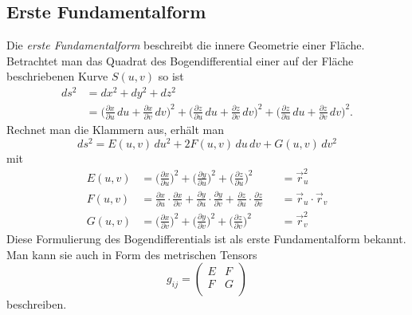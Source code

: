\subsection{Erste Fundamentalform
\label{mongeampere:subsection:finibus}}
Die \emph{erste Fundamentalform} beschreibt die innere Geometrie einer Fläche.
%
%
Betrachtet man das Quadrat des Bogendifferential einer auf der Fläche 
%
beschriebenen Kurve $S(u,v)$ so ist 
\begin{equation*}
  \begin{split}
    d s^2 &= d x^2 + d y^2 + d z^2 \\
          &= \biggl(\frac{\partial x}{\partial u}\,d u + \frac{\partial x}{\partial v}\,d v  \biggr)^2
          + \biggl(\frac{\partial z}{\partial u}\,d u + \frac{\partial z}{\partial v}\,d v  \biggr)^2
          + \biggl(\frac{\partial z}{\partial u}\,d u + \frac{\partial z}{\partial v}\,d v  \biggr)^2.
  \end{split}
\end{equation*}
Rechnet man die Klammern aus, erhält man 
\begin{equation*}
    d s^2 = E(u,v) \,d u^2 + 2F(u,v) \,d u \,d v + G(u,v)\,d v^2
\end{equation*}
mit
\begin{equation*}
\begin{aligned}
     E(u,v) &= \biggl(\frac{\partial x}{\partial u} \biggr)^2 +
     \biggl(\frac{\partial y}{\partial u} \biggr)^2 +
     \biggl(\frac{\partial z}{\partial u} \biggr)^2 
            &&= \vec r_u^2\\
     F(u,v) &= 
     \frac{\partial x}{\partial u} \cdot \frac{\partial x}{\partial v} +
     \frac{\partial y}{\partial u} \cdot \frac{\partial y}{\partial v} +
     \frac{\partial z}{\partial u} \cdot \frac{\partial z}{\partial v}
            &&= \vec r_u \cdot \vec r_v \\
      G(u,v) &= \biggl(\frac{\partial x}{\partial v} \biggr)^2 +
     \biggl(\frac{\partial y}{\partial v} \biggr)^2 +
     \biggl(\frac{\partial z}{\partial v} \biggr)^2 
             &&= \vec r_v ^2
\end{aligned}
\end{equation*}
Diese Formulierung des Bogendifferentials ist als erste Fundamentalform bekannt.
Man kann sie auch in Form des metrischen Tensors 
\begin{equation*}
  g_{ij} = \begin{pmatrix}
    E & F \\
    F & G \\
  \end{pmatrix}
\end{equation*}
beschreiben.

